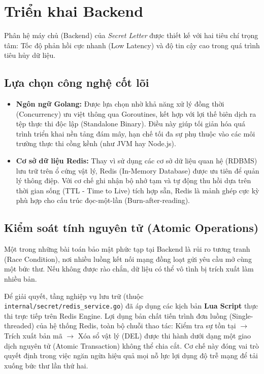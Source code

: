 \section{Triển khai Backend}

Phân hệ máy chủ (Backend) của \textit{Secret Letter} được thiết kế với hai tiêu chí trọng tâm: Tốc độ phản hồi cực nhanh (Low Latency) và độ tin cậy cao trong quá trình tiêu hủy dữ liệu.

\subsection{Lựa chọn công nghệ cốt lõi}

\begin{itemize}
    \item \textbf{Ngôn ngữ Golang:} Được lựa chọn nhờ khả năng xử lý đồng thời (Concurrency) ưu việt thông qua Goroutines, kết hợp với lợi thế biên dịch ra tệp thực thi độc lập (Standalone Binary). Điều này giúp tối giản hóa quá trình triển khai nền tảng đám mây, hạn chế tối đa sự phụ thuộc vào các môi trường thực thi cồng kềnh (như JVM hay Node.js).
    \item \textbf{Cơ sở dữ liệu Redis:} Thay vì sử dụng các cơ sở dữ liệu quan hệ (RDBMS) lưu trữ trên ổ cứng vật lý, Redis (In-Memory Database) được ưu tiên để quản lý thông điệp. Với cơ chế ghi nhận bộ nhớ tạm và tự động thu hồi dựa trên thời gian sống (TTL - Time to Live) tích hợp sẵn, Redis là mảnh ghép cực kỳ phù hợp cho cấu trúc đọc-một-lần (Burn-after-reading).
\end{itemize}

\subsection{Kiểm soát tính nguyên tử (Atomic Operations)}

Một trong những bài toán bảo mật phức tạp tại Backend là rủi ro tương tranh (Race Condition), nơi nhiều luồng kết nối mạng đồng loạt gửi yêu cầu mở cùng một bức thư. Nếu không được rào chắn, dữ liệu có thể vô tình bị trích xuất làm nhiều bản.

Để giải quyết, tầng nghiệp vụ lưu trữ (thuộc \texttt{internal/secret/redis\_service.go}) đã áp dụng các kịch bản \textbf{Lua Script} thực thi trực tiếp trên Redis Engine. Lợi dụng bản chất tiến trình đơn luồng (Single-threaded) của hệ thống Redis, toàn bộ chuỗi thao tác: Kiểm tra sự tồn tại $\rightarrow$ Trích xuất bản mã $\rightarrow$ Xóa sổ vật lý (DEL) được thi hành dưới dạng một giao dịch nguyên tử (Atomic Transaction) không thể chia cắt. Cơ chế này đóng vai trò quyết định trong việc ngăn ngừa hiệu quả mọi nỗ lực lợi dụng độ trễ mạng để tải xuống bức thư lần thứ hai.

